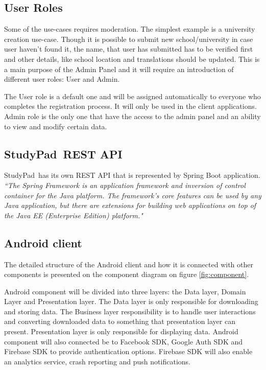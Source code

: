 \documentclass[thesis=B,english]{FITthesis}[2012/10/20]
\newcommand{\appname}{StudyPad}
\newcommand{\quoting}[1]{\textit{``#1"}}
\begin{document}
\subsection{User Roles}
Some of the use-cases requires moderation. The simplest example is a university creation use-case. Though it is possible to submit new school/university in case user haven't found it, the name, that user has submitted has to be verified first and other details, like school location and translations should be updated. This is a main purpose of the Admin Panel and it will require an introduction of different user roles: User and Admin. 

The User role is a default one and will be assigned automatically to everyone who completes the registration process. It will only be used in the client applications.
Admin role is the only one that have the access to the admin panel and an ability to view and modify certain data.

\subsection{\appname\ REST API}
\appname\ has its own REST API that is represented by Spring Boot application. \cite{studypad-backend} \quoting{The Spring Framework is an application framework and inversion of control container for the Java platform. The framework's core features can be used by any Java application, but there are extensions for building web applications on top of the Java EE (Enterprise Edition) platform.} \cite{wiki-spring}

\subsection{Android client}

The detailed structure of the Android client and how it is connected with other components is presented on the component diagram on figure \ref{fig:component}. 

 Android component will be divided into three layers: the Data layer, Domain Layer and Presentation layer. The Data layer is only responsible for downloading and storing data. The Business layer responsibility is to handle user interactions and converting downloaded data to something that presentation layer can present. Presentation layer is only responsible for displaying data. Android component will also connected be to Facebook SDK, Google Auth SDK and Firebase SDK to provide authentication options. Firebase SDK will also enable an analytics service, crash reporting and push notifications.
\end{document}
